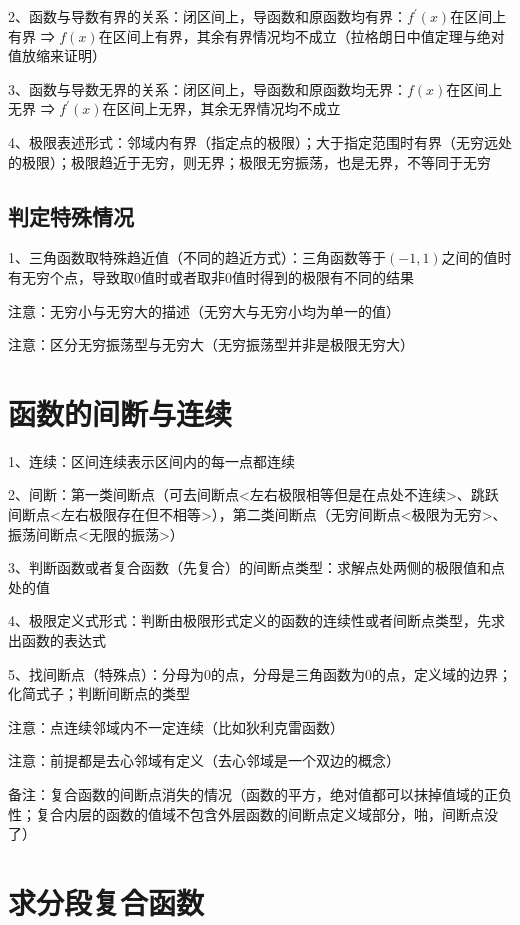 2、函数与导数有界的关系：闭区间上，导函数和原函数均有界：$f^{\prime}(x)$在区间上有界 ⇒ $f(x)$在区间上有界，其余有界情况均不成立（拉格朗日中值定理与绝对值放缩来证明）

3、函数与导数无界的关系：闭区间上，导函数和原函数均无界：$f(x)$在区间上无界 ⇒ $f^{\prime}(x)$在区间上无界，其余无界情况均不成立

4、极限表述形式：邻域内有界（指定点的极限）；大于指定范围时有界（无穷远处的极限）；极限趋近于无穷，则无界；极限无穷振荡，也是无界，不等同于无穷



\subsection{判定特殊情况}

1、三角函数取特殊趋近值（不同的趋近方式）：三角函数等于$(-1,1)$之间的值时有无穷个点，导致取0值时或者取非0值时得到的极限有不同的结果

注意：无穷小与无穷大的描述（无穷大与无穷小均为单一的值）

注意：区分无穷振荡型与无穷大（无穷振荡型并非是极限无穷大）

\section{函数的间断与连续}

1、连续：区间连续表示区间内的每一点都连续

2、间断：第一类间断点（可去间断点<左右极限相等但是在点处不连续>、跳跃间断点<左右极限存在但不相等>），第二类间断点（无穷间断点<极限为无穷>、振荡间断点<无限的振荡>）

3、判断函数或者复合函数（先复合）的间断点类型：求解点处两侧的极限值和点处的值

4、极限定义式形式：判断由极限形式定义的函数的连续性或者间断点类型，先求出函数的表达式

5、找间断点（特殊点）：分母为0的点，分母是三角函数为0的点，定义域的边界；化简式子；判断间断点的类型

注意：点连续邻域内不一定连续（比如狄利克雷函数）

注意：前提都是去心邻域有定义（去心邻域是一个双边的概念）

备注：复合函数的间断点消失的情况（函数的平方，绝对值都可以抹掉值域的正负性；复合内层的函数的值域不包含外层函数的间断点定义域部分，啪，间断点没了）

\section{求分段复合函数}


